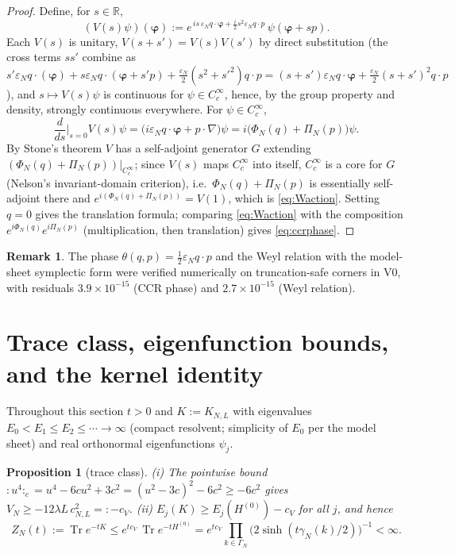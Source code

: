 \documentclass[11pt,a4paper]{article}
\theoremstyle{plain}
\newtheorem{proposition}[theorem]{Proposition}
\theoremstyle{definition}
\newtheorem{remark}[theorem]{Remark}
\newcommand{\R}{\mathbb{R}}
\newcommand{\eps}{\varepsilon}
\DeclareMathOperator{\Trace}{Tr}
\DeclareMathOperator{\sh}{sinh}
\begin{document}
\begin{proof}
Define, for $s\in\R$,
\[
 (V(s)\psi)(\bm\varphi)
 :=e^{\,is\,\eps_Nq\cdot\bm\varphi+\frac i2s^2\eps_N q\cdot p}\,
 \psi(\bm\varphi+sp).
\]
Each $V(s)$ is unitary, $V(s+s')=V(s)V(s')$ by direct substitution
(the cross terms $ss'$ combine as
$s'\eps_Nq\cdot(\bm\varphi)+s\eps_Nq\cdot(\bm\varphi+s'p)
+\tfrac{\eps_N}2(s^2+s'^2)q\cdot p
=(s+s')\eps_Nq\cdot\bm\varphi+\tfrac{\eps_N}2(s+s')^2q\cdot p$),
and $s\mapsto V(s)\psi$ is continuous for $\psi\in C_c^\infty$, hence, by the
group property and density, strongly continuous everywhere. For
$\psi\in C_c^\infty$,
\[
 \frac d{ds}\Big|_{s=0}V(s)\psi
 =\bigl(i\eps_Nq\cdot\bm\varphi+p\cdot\nabla\bigr)\psi
 =i\bigl(\Phi_N(q)+\Pi_N(p)\bigr)\psi .
\]
By Stone's theorem $V$ has a self-adjoint generator $G$ extending
$(\Phi_N(q)+\Pi_N(p))|_{C_c^\infty}$; since $V(s)$ maps $C_c^\infty$ into
itself, $C_c^\infty$ is a core for $G$ (Nelson's invariant-domain criterion),
i.e.\ $\Phi_N(q)+\Pi_N(p)$ is essentially self-adjoint there and
$e^{i(\Phi_N(q)+\Pi_N(p))}=V(1)$, which is \eqref{eq:Waction}. Setting $q=0$
gives the translation formula; comparing \eqref{eq:Waction} with the
composition $e^{i\Phi_N(q)}e^{i\Pi_N(p)}$ (multiplication, then translation)
gives \eqref{eq:ccrphase}.
\end{proof}

\begin{remark}
The phase $\theta(q,p)=\tfrac12\eps_Nq\cdot p$ and the Weyl relation with the
model-sheet symplectic form were verified numerically on truncation-safe
corners in V0, with residuals $3.9\times10^{-15}$ (CCR phase) and
$2.7\times10^{-15}$ (Weyl relation).
\end{remark}

\section{Trace class, eigenfunction bounds, and the kernel identity}
\label{sec:kernel}

Throughout this section $t>0$ and $K:=K_{N,L}$ with eigenvalues
$E_0<E_1\le E_2\le\cdots\to\infty$ (compact resolvent; simplicity of $E_0$
per the model sheet) and real orthonormal eigenfunctions $\psi_j$.

\begin{proposition}[trace class]\label{prop:traceclass}
\emph{(i)} The pointwise bound
${:}u^4{:}_c=u^4-6cu^2+3c^2=(u^2-3c)^2-6c^2\ge-6c^2$ gives
$V_N\ge-12\lambda L\,c_{N,L}^2=:-c_V$.
\emph{(ii)} $E_j(K)\ge E_j(H^{(0)})-c_V$ for all $j$, and hence
\[
 Z_N(t):=\Trace e^{-tK}\le e^{tc_V}\,\Trace e^{-tH^{(0)}}
 =e^{tc_V}\prod_{k\in\Gamma_N}\bigl(2\sh(t\gamma_N(k)/2)\bigr)^{-1}<\infty .
\]
\end{proposition}
\end{document}
